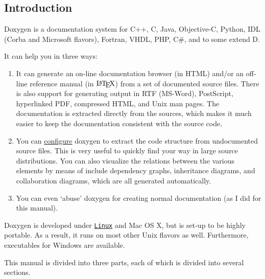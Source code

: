\begin{center}  \end{center} 

\subsection*{Introduction}

Doxygen is a documentation system for C++, C, Java, Objective-C, Python, IDL (Corba and Microsoft flavors), Fortran, VHDL, PHP, C\#, and to some extend D.

It can help you in three ways: \begin{enumerate}
\item It can generate an on-line documentation browser (in HTML) and/or an off-line reference manual (in $\mbox{\LaTeX}$) from a set of documented source files. There is also support for generating output in RTF (MS-Word), PostScript, hyperlinked PDF, compressed HTML, and Unix man pages. The documentation is extracted directly from the sources, which makes it much easier to keep the documentation consistent with the source code. \item You can \hyperlink{starting_extract_all}{configure} doxygen to extract the code structure from undocumented source files. This is very useful to quickly find your way in large source distributions. You can also visualize the relations between the various elements by means of include dependency graphs, inheritance diagrams, and collaboration diagrams, which are all generated automatically. \item You can even `abuse' doxygen for creating normal documentation (as I did for this manual). \end{enumerate}


Doxygen is developed under \href{http://www.linux.org}{\tt Linux} and Mac OS X, but is set-up to be highly portable. As a result, it runs on most other Unix flavors as well. Furthermore, executables for Windows are available.

\par
 This manual is divided into three parts, each of which is divided into several sections.

